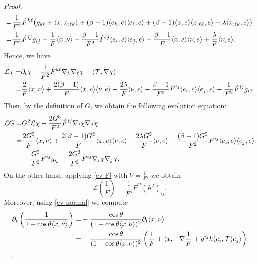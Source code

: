 \documentclass[11pt,reqno]{amsart}
\theoremstyle{definition}
\theoremstyle{remark}
\numberwithin{equation}{section}
\renewcommand{\(}{\left(}
\renewcommand{\)}{\right)}
\renewcommand{\-}{\overline}
\begin{document}
\begin{proof}
\begin{align}
		=&\frac{1}{F^2}\dot{F}^{k\ell}\big(g_{k\ell}+\langle x,x_{;\ell k}\rangle+(\beta-1)\langle e_k,e\rangle\langle e_{\ell},e\rangle+(\beta-1)\langle x,e\rangle\langle x_{;\ell k},e\rangle-\lambda\langle x_{;\ell k},e\rangle \big)\notag\\
	=&\frac{1}{F^2}\dot{F}^{ij}g_{ij}-\frac{1}{F}\langle x,\nu\rangle+\frac{\beta-1}{F^2}\dot{F}^{ij}\langle e_i,e\rangle\langle e_j,e\rangle-\frac{\beta-1}{F}\langle x,e\rangle\langle \nu,e\rangle+\frac{\lambda}{F}\langle \nu,e\rangle.\label{hessian-chi}
\end{align}
Hence, we have
\begin{align}
	\mathcal{L}{\chi}=&\partial_t\chi-\frac{1}{F^2}\dot{F}^{k\ell}\nabla_k\nabla_{\ell}{\chi}-\langle \mathcal{T},\nabla\chi \rangle\notag\\
	=&\frac{2}{F}\langle x,\nu\rangle+\frac{2(\beta-1)}{F}\langle x,e\rangle\langle \nu,e\rangle-\frac{2\lambda}{F}\langle \nu,e\rangle-\frac{\beta-1}{F^2}\dot{F}^{ij}\langle e_i,e\rangle\langle e_j,e\rangle-\frac{1}{F^2}\dot{F}^{ij}g_{ij}.\label{L-chi}
\end{align}
Then, by the definition of $G$, we obtain the following evolution equation:
\begin{align}
	\mathcal{L}G=&G^2\mathcal{L}{\chi}-\frac{2G^3}{F^2}\dot{F}^{ij}\nabla_i{\chi}\nabla_j{\chi}\notag\\
	=&\frac{2G^2}{F}\langle x,\nu\rangle+\frac{2(\beta-1)G^2}{F}\langle x,e\rangle\langle \nu,e\rangle-\frac{2\lambda G^2}{F}\langle \nu,e\rangle-\frac{(\beta-1)G^2}{F^2}\dot{F}^{ij}\langle e_i,e\rangle\langle e_j,e\rangle\notag\\
	&-\frac{G^2}{F^2}\dot{F}^{ij}g_{ij}-\frac{2G^3}{F^2}\dot{F}^{ij}\nabla_i{\chi}\nabla_j{\chi}.\label{L-G}
\end{align}
On the other hand, applying \eqref{ev-F} with $V=\frac{1}{F}$, we obtain
\begin{equation}\label{L-F}
	\mathcal{L}\left({\frac{1}{F}}\right)=\frac{1}{F^3}\dot{F}^{ij}(h^2)_{ij}.
\end{equation}
Moreover, using \eqref{ev-normal} we compute
\begin{align}
	\partial_t\left(\frac{1}{1+\cos\theta\langle x,\nu\rangle}\right)=&-\frac{\cos\theta}{(1+\cos\theta\langle x,\nu\rangle)^2}\partial_t{\langle x,\nu\rangle}\notag\\
	=&-\frac{\cos\theta}{(1+\cos\theta\langle x,\nu\rangle)^2}\left(\frac{1}{F}+\langle x,-\nabla \frac{1}{F}+g^{ij}h(e_i,\mathcal{T})e_j\rangle\right)\notag\\

\end{align}
\end{proof}
\end{document}
